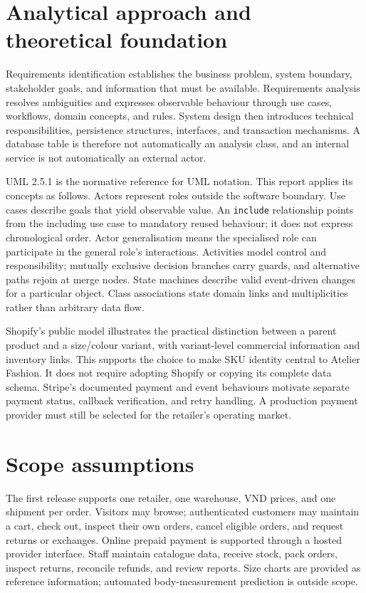 \section{Analytical approach and theoretical foundation}
Requirements identification establishes the business problem, system boundary, stakeholder goals, and information that must be available. Requirements analysis resolves ambiguities and expresses observable behaviour through use cases, workflows, domain concepts, and rules. System design then introduces technical responsibilities, persistence structures, interfaces, and transaction mechanisms. A database table is therefore not automatically an analysis class, and an internal service is not automatically an external actor.

UML 2.5.1 is the normative reference for UML notation\cite{uml}. This report applies its concepts as follows. Actors represent roles outside the software boundary. Use cases describe goals that yield observable value. An \texttt{include} relationship points from the including use case to mandatory reused behaviour; it does not express chronological order. Actor generalisation means the specialised role can participate in the general role's interactions. Activities model control and responsibility; mutually exclusive decision branches carry guards, and alternative paths rejoin at merge nodes. State machines describe valid event-driven changes for a particular object. Class associations state domain links and multiplicities rather than arbitrary data flow.

Shopify's public model illustrates the practical distinction between a parent product and a size/colour variant, with variant-level commercial information and inventory links\cite{shopifyvariant,shopifyinventory}. This supports the choice to make SKU identity central to Atelier Fashion. It does not require adopting Shopify or copying its complete data schema. Stripe's documented payment and event behaviours motivate separate payment status, callback verification, and retry handling\cite{stripeintent,stripewebhook,stripeidempotent}. A production payment provider must still be selected for the retailer's operating market.

\section{Scope assumptions}
The first release supports one retailer, one warehouse, VND prices, and one shipment per order. Visitors may browse; authenticated customers may maintain a cart, check out, inspect their own orders, cancel eligible orders, and request returns or exchanges. Online prepaid payment is supported through a hosted provider interface. Staff maintain catalogue data, receive stock, pack orders, inspect returns, reconcile refunds, and review reports. Size charts are provided as reference information; automated body-measurement prediction is outside scope.


